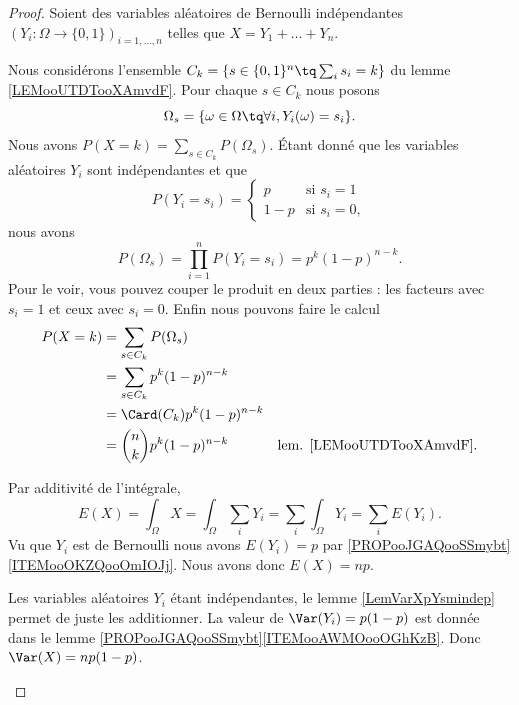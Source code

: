 \begin{proof}
	Soient des variables aléatoires de Bernoulli indépendantes \( (Y_i \colon \Omega\to \{ 0,1 \})_{i=1,\ldots,n}\) telles que \( X=Y_1+\ldots+Y_n\).
	\begin{subproof}
		\spitem[Pour \( P(X=k)\)]
		Nous considérons l'ensemble \( C_k=\{ s\in \{ 0,1 \}^n\tq \sum_is_i=k \}\) du lemme \ref{LEMooUTDTooXAmvdF}. Pour chaque \( s\in C_k\) nous posons
		\begin{equation}
			\Omega_s=\{ \omega\in \Omega\tq\forall i, Y_i(\omega)=s_i  \}.
		\end{equation}
		Nous avons \( P(X=k)=\sum_{s\in C_k}P(\Omega_s)\). Étant donné que les variables aléatoires \( Y_i\) sont indépendantes et que
		\begin{equation}
			P(Y_i=s_i)=\begin{cases}
				p   & \text{si } s_i=1  \\
				1-p & \text{si } s_i=0,
			\end{cases}
		\end{equation}
		nous avons
		\begin{equation}
			P(\Omega_s)=\prod_{i=1}^nP(Y_i=s_i)=p^k(1-p)^{n-k}.
		\end{equation}
		Pour le voir, vous pouvez couper le produit en deux parties : les facteurs avec \( s_i=1\) et ceux avec \( s_i=0\). Enfin nous pouvons faire le calcul
		\begin{subequations}
			\begin{align}
				P(X=k) & =\sum_{s\in C_k}P(\Omega_s)                                            \\
				       & =\sum_{s\in C_k}p^k(1-p)^{n-k}                                         \\
				       & =\Card(C_k)p^{k}(1-p)^{n-k}                                            \\
				       & =\binom{ n }{ k }p^k(1-p)^{n-k} & \text{lem. \ref{LEMooUTDTooXAmvdF}.}
			\end{align}
		\end{subequations}

		Par additivité de l'intégrale,
		\begin{equation}
			E(X)=\int_{\Omega}X=\int_{\Omega}\sum_iY_i=\sum_i\int_{\Omega}Y_i=\sum_iE(Y_i).
		\end{equation}
		Vu que \( Y_i\) est de Bernoulli nous avons \( E(Y_i)=p\) par \ref{PROPooJGAQooSSmybt}\ref{ITEMooOKZQooOmIOJj}. Nous avons donc \( E(X)=np\).

		Les variables aléatoires \( Y_i\) étant indépendantes, le lemme \ref{LemVarXpYsmindep} permet de juste les additionner. La valeur de \(\Var(Y_i)=p(1-p) \) est donnée dans le lemme \ref{PROPooJGAQooSSmybt}\ref{ITEMooAWMOooOGhKzB}. Donc \( \Var(X)=np(1-p)\).
	\end{subproof}
\end{proof}



